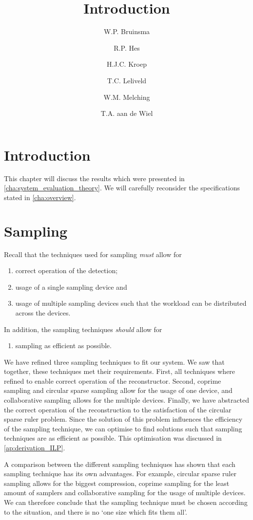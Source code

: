\documentclass[a4paper, openany, oneside]{memoir}
\title{Introduction}
\author{W.P. Bruinsma \and R.P. Hes \and H.J.C. Kroep \and T.C. Leliveld \and W.M. Melching \and T.A. aan de Wiel}
\begin{document}
\section{Introduction}
This chapter will discuss the results which were presented in \cref{cha:system_evaluation_theory}. We will carefully reconsider the specifications stated in \cref{cha:overview}.

\section{Sampling}
Recall that the techniques used for sampling \emph{must} allow for
\begin{enumerate}
    \item correct operation of the detection;
    \item usage of a single sampling device and
    \item usage of multiple sampling devices such that the workload can be distributed across the devices.
\end{enumerate}
In addition, the sampling techniques \emph{should} allow for
\begin{enumerate}
    \item sampling as efficient as possible.
\end{enumerate}

We have refined three sampling techniques to fit our system. We saw that together, these techniques met their requirements. First, all techniques where refined to enable correct operation of the reconstructor. Second, coprime sampling and circular sparse sampling allow for the usage of one device, and collaborative sampling allows for the multiple devices. Finally, we have abstracted the correct operation of the reconstruction to the satisfaction of the circular sparse ruler problem. Since the solution of this problem influences the efficiency of the sampling technique, we can optimise to find solutions such that sampling techniques are as efficient as possible. This optimisation was discussed in \cref{ap:derivation_ILP}.

A comparison between the different sampling techniques has shown that each sampling technique has its own advantages. For example, circular sparse ruler sampling allows for the biggest compression, coprime sampling for the least amount of samplers and collaborative sampling for the usage of multiple devices. We can therefore conclude that the sampling technique must be chosen according to the situation, and there is no `one size which fits them all'. 
\end{document}
